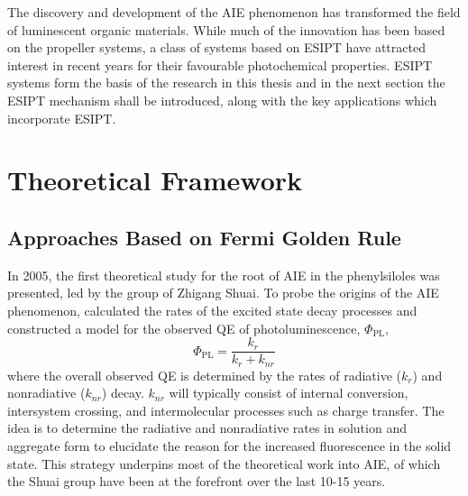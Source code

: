 The discovery and development of the \ac{AIE} phenomenon has transformed the field of luminescent organic materials. While much of the innovation has been based on the propeller systems, a class of systems based on \ac{ESIPT} have attracted interest in recent years for their favourable photochemical properties. \ac{ESIPT} systems form the basis of the research in this thesis and in the next section the \ac{ESIPT} mechanism shall be introduced, along with the key applications which incorporate \ac{ESIPT}.
\section{Theoretical Framework }\label{section: lom theory}
\subsection{Approaches Based on Fermi Golden Rule}\label{section: lom FGR}
In 2005, the first theoretical study for the root of AIE in the phenylsiloles was presented, led by the group of Zhigang Shuai.\cite{Yui2005} To probe the origins of the AIE phenomenon, calculated the rates of the excited state decay processes and constructed a model for the observed \ac{QE} of photoluminescence, $\Phi_{\mathrm{PL}}$, 
\begin{equation}\label{equation: QE}
    \Phi_{\mathrm{PL}}=\frac{k_{r}}{k_{r}+k_{nr}}
\end{equation}
where the overall observed \ac{QE} is determined by the rates of radiative ($k_{r}$) and nonradiative ($k_{nr}$) decay. $k_{nr}$ will typically consist of internal conversion, intersystem crossing, and intermolecular processes such as charge transfer. The idea is to determine the radiative and nonradiative rates in solution and aggregate form to elucidate the reason for the increased fluorescence in the solid state. This strategy underpins most of the theoretical work into AIE, of which the Shuai group have been at the forefront over the last 10-15 years. 


